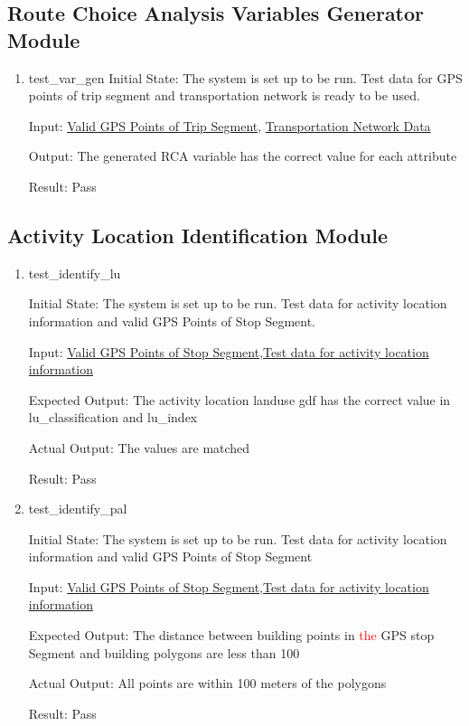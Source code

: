\documentclass[12pt, titlepage]{article}
\begin{document}
\subsection{Route Choice Analysis Variables Generator Module}
\begin{enumerate}
    \item{test\_var\_gen}\label{test_var_gen}
    Initial State: The system is set up to be run. Test data for GPS points of trip segment and transportation network is ready to be used.

    Input: \href{https://github.com/paezha/PyERT-BLACK/tree/rev0-test/test/test_data/test_rs_trip_seg}{Valid GPS Points of Trip Segment}, \href{https://github.com/paezha/PyERT-BLACK/tree/rev0-test/test/test_data/test_rs_network_g.osm}{Transportation Network Data}

    Output: The generated RCA variable has the correct value for each attribute

    Result: Pass
\end{enumerate}

\subsection{Activity Location Identification Module}
\begin{enumerate}
    \item{test\_identify\_lu} \label{test_identify_lu}
        
    Initial State: The system is set up to be run. Test data for activity location information and valid GPS Points of Stop Segment.
    
    Input: \href{https://github.com/paezha/PyERT-BLACK/tree/rev0-test/test/test_data/test_al_info_stop_seg}{Valid GPS Points of Stop Segment},\href{https://github.com/paezha/PyERT-BLACK/blob/rev0-test/test/test_data/test_al_info_data.gpkg}{Test data for activity location information}
    
    Expected Output: The activity location landuse gdf has the correct value in lu\_classification and 
    lu\_index
    
    Actual Output: The values are matched 

    Result: Pass
    \item{test\_identify\_pal} \label{test_identify_pal}
    
    Initial State: The system is set up to be run. Test data for activity location information and valid GPS Points of Stop Segment
    
    Input: \href{https://github.com/paezha/PyERT-BLACK/tree/rev0-test/test/test_data/test_al_info_stop_seg}{Valid GPS Points of Stop Segment},\href{https://github.com/paezha/PyERT-BLACK/blob/rev0-test/test/test_data/test_al_info_data.gpkg}{Test data for activity location information}
    
    Expected Output: The distance between building points in \textcolor{red}{the} GPS stop Segment and building polygons are less than 100
    
    Actual Output: All points are within 100 meters of the polygons

    Result: Pass
\end{enumerate}
\end{document}
